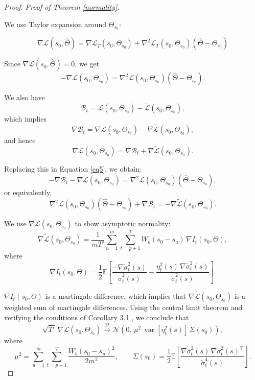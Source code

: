 \documentclass[fleqn,11pt]{article}
\begin{document}
\begin{proof}\emph{Proof of Theorem \ref{normality}.}

We use Taylor expansion around $\Theta_{s_0}$:

\begin{equation}\label{eq5}
\nabla \mathcal{L}\left(s_0, \hat{\Theta}\right)
=
\nabla \mathcal{L}_{T}\left(s_0, \Theta_{s_0}\right)
+
\nabla^2 \mathcal{L}_{T}\left(s_0, \Theta_{s_0}\right)\left(\hat{\Theta} - \Theta_{s_0}\right)
\end{equation}

Since $\nabla \mathcal{L}\left(s_0, \hat{\Theta}\right) = 0$, we get
$$
-\nabla \mathcal{L}\left(s_0, \Theta_{s_0}\right)
=
\nabla^2 \mathcal{L}\left(s_0, \Theta_{s_0}\right)\left(\hat{\Theta} - \Theta_{s_0}\right).
$$

We also have
$$
\mathscr{B}_t = \mathcal{L}\left(s_0, \Theta_{s_0}\right) - \tilde{\mathcal{L}}\left(s_0, \Theta_{s_0}\right),
$$
which implies
$$
\nabla \mathscr{B}_t = \nabla \mathcal{L}\left(s_0, \Theta_{s_0}\right) - \nabla \tilde{\mathcal{L}}\left(s_0, \Theta_{s_0}\right),
$$
and hence
$$
\nabla \mathcal{L}\left(s_0, \Theta_{s_0}\right)
=
\nabla \mathscr{B}_t + \nabla \tilde{\mathcal{L}}\left(s_0, \Theta_{s_0}\right).
$$

Replacing this in Equation \ref{eq5}, we obtain:
$$
- \nabla \mathscr{B}_t - \nabla \tilde{\mathcal{L}}\left(s_0, \Theta_{s_0}\right)
=
\nabla^2 \mathcal{L}\left(s_0, \Theta_{s_0}\right)\left(\hat{\Theta} - \Theta_{s_0}\right),
$$
or equivalently,
$$
\nabla^2 \mathcal{L}\left(s_0, \Theta_{s_0}\right)\left(\hat{\Theta} - \Theta_{s_0}\right)
+
\nabla \mathscr{B}_t
=
- \nabla \tilde{\mathcal{L}}\left(s_0, \Theta_{s_0}\right).
$$

We use $\nabla \tilde{\mathcal{L}}\left(s_0, \Theta_{s_0}\right)$ to show asymptotic normality:
\begin{equation}
\nabla \tilde{\mathcal{L}}\left(s_0, \Theta_{s_0}\right)
=
\frac{1}{m T'} \sum_{u=1}^m \sum_{t=p+1}^T W_b(s_0 - s_u)\, \nabla I_t(s_0,\Theta),
\end{equation}
where
$$
\nabla I_t(s_0,\Theta)
=
\frac{1}{2} \mathbb{E} \left[
\frac{- \nabla \widetilde{\sigma}_t^2(s)}{\widetilde{\sigma}_t^2(s)}
-
\frac{\eta_t^2(s)\, \nabla \widetilde{\sigma}_t^2(s)}{\widetilde{\sigma}_t^2(s)}
\right].
$$

$\nabla I_t(s_0,\Theta)$ is a martingale difference, which implies that $\nabla \tilde{\mathcal{L}}\left(s_0, \Theta_{s_0}\right)$ is a weighted sum of martingale differences. Using the central limit theorem and verifying the conditions of Corollary 3.1 \cite{hall2014martingale}, we conclude that
$$
\sqrt{T'}\, \nabla \tilde{\mathcal{L}}\left(s_0, \Theta_{s_0}\right)
\xrightarrow{\mathcal{D}}
\mathcal{N}\left(0,\, \mu^2\, \operatorname{var}\left[\eta_t^2(s)\right]\, \Sigma(s_0)\right),
$$
where
$$
\mu^2 = \sum_{u=1}^m \sum_{t=p+1}^T \frac{W_b(s_0 - s_u)^2}{2m^2},
\qquad
\Sigma(s_0) = \frac{1}{2} \mathbb{E} \left[
\frac{\nabla \widetilde{\sigma}_t^2(s)\, \nabla \widetilde{\sigma}_t^2(s)^\top}
{\widetilde{\sigma}_t^4(s)}
\right].
$$


\end{proof}
\end{document}
